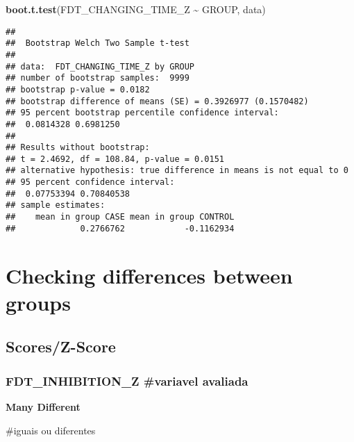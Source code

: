 \documentclass[
]{article}
\newenvironment{Shaded}{\begin{snugshade}}{\end{snugshade}}
\newcommand{\AttributeTok}[1]{\textcolor[rgb]{0.13,0.29,0.53}{#1}}
\newcommand{\DecValTok}[1]{\textcolor[rgb]{0.00,0.00,0.81}{#1}}
\newcommand{\FunctionTok}[1]{\textcolor[rgb]{0.13,0.29,0.53}{\textbf{#1}}}
\newcommand{\NormalTok}[1]{#1}
\newcommand{\SpecialCharTok}[1]{\textcolor[rgb]{0.81,0.36,0.00}{\textbf{#1}}}
\newcommand{\StringTok}[1]{\textcolor[rgb]{0.31,0.60,0.02}{#1}}
\begin{document}
\begin{Shaded}
\begin{Highlighting}[]
\FunctionTok{boot.t.test}\NormalTok{(FDT\_CHANGING\_TIME\_Z }\SpecialCharTok{\textasciitilde{}}\NormalTok{ GROUP, data)}
\end{Highlighting}
\end{Shaded}

\begin{verbatim}
## 
##  Bootstrap Welch Two Sample t-test
## 
## data:  FDT_CHANGING_TIME_Z by GROUP
## number of bootstrap samples:  9999
## bootstrap p-value = 0.0182 
## bootstrap difference of means (SE) = 0.3926977 (0.1570482) 
## 95 percent bootstrap percentile confidence interval:
##  0.0814328 0.6981250
## 
## Results without bootstrap:
## t = 2.4692, df = 108.84, p-value = 0.0151
## alternative hypothesis: true difference in means is not equal to 0
## 95 percent confidence interval:
##  0.07753394 0.70840538
## sample estimates:
##    mean in group CASE mean in group CONTROL 
##             0.2766762            -0.1162934
\end{verbatim}

\section{\texorpdfstring{\textbf{Checking differences between
groups}}{Checking differences between groups}}\label{checking-differences-between-groups-8}

\subsection{\texorpdfstring{\textbf{Scores/Z-Score}}{Scores/Z-Score}}\label{scoresz-score-8}

\subsubsection{FDT\_INHIBITION\_Z \#variavel
avaliada}\label{fdt_inhibition_z-variavel-avaliada}

\textbf{Many Different}

\#iguais ou diferentes

\begin{Shaded}
\end{Shaded}
\end{document}
